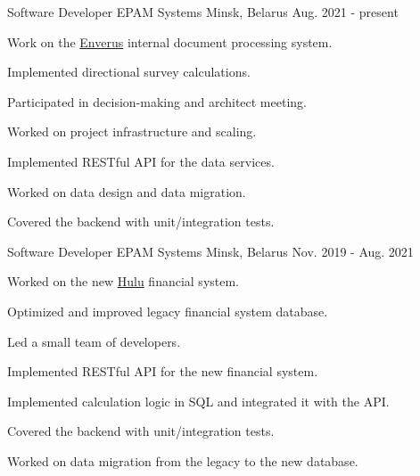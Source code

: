 

\begin{cventries}
  \cventry
    {Software Developer} %
    {EPAM Systems} %
    {Minsk, Belarus} %
    {Aug. 2021 - present} %
    {
      \begin{cvitems} %
        \item {Work on the \href{https://www.enverus.com/}{Enverus} internal document processing system.}
        \item {Implemented directional survey calculations.}
        \item {Participated in decision-making and architect meeting.}
        \item {Worked on project infrastructure and scaling.}
        \item {Implemented RESTful API for the data services.}
        \item {Worked on data design and data migration.}
        \item {Covered the backend with unit/integration tests.}
      \end{cvitems}
    }

  \cventry
    {Software Developer} %
    {EPAM Systems} %
    {Minsk, Belarus} %
    {Nov. 2019 - Aug. 2021} %
    {
      \begin{cvitems} %
        \item {Worked on the new \href{www.hulu.com}{Hulu} financial system.}
        \item {Optimized and improved legacy financial system database.}
        \item {Led a small team of developers.}
        \item {Implemented RESTful API for the new financial system.}
        \item {Implemented calculation logic in SQL and integrated it with the API.}
        \item {Covered the backend with unit/integration tests.}
        \item {Worked on data migration from the legacy to the new database.}
      \end{cvitems}
    }


\end{cventries}
